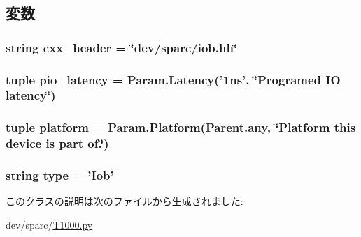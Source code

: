 \subsection{変数}
\hypertarget{classT1000_1_1Iob_a17da7064bc5c518791f0c891eff05fda}{
\subsubsection[{cxx\_\-header}]{\setlength{\rightskip}{0pt plus 5cm}string {\bf cxx\_\-header} = \char`\"{}dev/sparc/iob.hh\char`\"{}}}
\label{classT1000_1_1Iob_a17da7064bc5c518791f0c891eff05fda}
\hypertarget{classT1000_1_1Iob_ac3f272675842a6662ce8782e10fdba39}{
\subsubsection[{pio\_\-latency}]{\setlength{\rightskip}{0pt plus 5cm}tuple {\bf pio\_\-latency} = Param.Latency('1ns', \char`\"{}Programed IO latency\char`\"{})}}
\label{classT1000_1_1Iob_ac3f272675842a6662ce8782e10fdba39}
\hypertarget{classT1000_1_1Iob_ae6d09ca44893db6cdb66d62deaa1aefd}{
\subsubsection[{platform}]{\setlength{\rightskip}{0pt plus 5cm}tuple {\bf platform} = Param.Platform(Parent.any, \char`\"{}Platform this device is part of.\char`\"{})}}
\label{classT1000_1_1Iob_ae6d09ca44893db6cdb66d62deaa1aefd}
\hypertarget{classT1000_1_1Iob_acce15679d830831b0bbe8ebc2a60b2ca}{
\subsubsection[{type}]{\setlength{\rightskip}{0pt plus 5cm}string {\bf type} = '{\bf Iob}'}}
\label{classT1000_1_1Iob_acce15679d830831b0bbe8ebc2a60b2ca}


このクラスの説明は次のファイルから生成されました:\begin{DoxyCompactItemize}
\item 
dev/sparc/\hyperlink{T1000_8py}{T1000.py}\end{DoxyCompactItemize}
